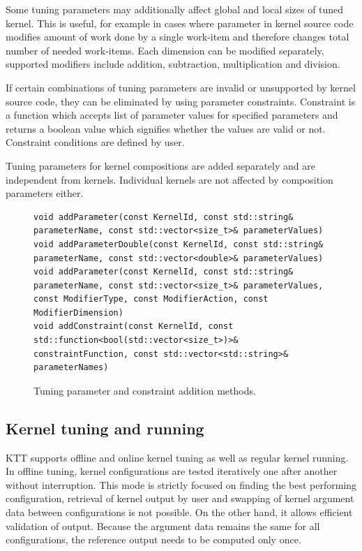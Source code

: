 \documentclass
[
    digital, %
    oneside, %
    table, %
    nolof, %
    nolot, %
    nocover %
]{fithesis3}
\begin{document}
Some tuning parameters may additionally affect global and local sizes of tuned kernel. This is useful, for example in cases where parameter in kernel
source code modifies amount of work done by a single work-item and therefore changes total number of needed work-items. Each dimension can be modified
separately, supported modifiers include addition, subtraction, multiplication and division.

If certain combinations of tuning parameters are invalid or unsupported by kernel source code, they can be eliminated by using parameter constraints.
Constraint is a function which accepts list of parameter values for specified parameters and returns a boolean value which signifies whether the values
are valid or not. Constraint conditions are defined by user.

Tuning parameters for kernel compositions are added separately and are independent from kernels. Individual kernels are not affected by composition
parameters either.

\begin{figure}
\begin{lstlisting}
void addParameter(const KernelId, const std::string& parameterName, const std::vector<size_t>& parameterValues)
void addParameterDouble(const KernelId, const std::string& parameterName, const std::vector<double>& parameterValues)
void addParameter(const KernelId, const std::string& parameterName, const std::vector<size_t>& parameterValues, const ModifierType, const ModifierAction, const ModifierDimension)
void addConstraint(const KernelId, const std::function<bool(std::vector<size_t>)>& constraintFunction, const std::vector<std::string>& parameterNames)
\end{lstlisting}
\caption{Tuning parameter and constraint addition methods.}
\label{ktt-parameter-methods}
\end{figure}

\subsection{Kernel tuning and running}
KTT supports offline and online kernel tuning as well as regular kernel running. In offline tuning, kernel configurations are tested iteratively one
after another without interruption. This mode is strictly focused on finding the best performing configuration, retrieval of kernel output by user and
swapping of kernel argument data between configurations is not possible. On the other hand, it allows efficient validation of output. Because the
argument data remains the same for all configurations, the reference output needs to be computed only once.
\end{document}
